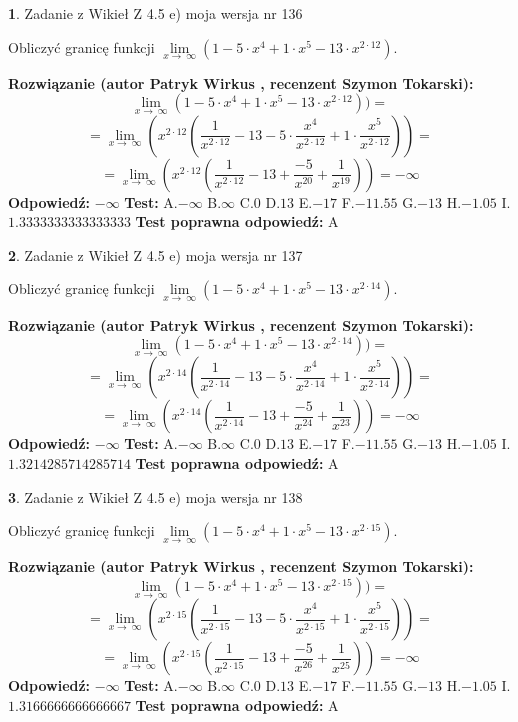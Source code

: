 \documentclass[12pt, a4paper]{article}
\theoremstyle{definition} %
\newtheorem{zad}{}
\newcommand{\zadStart}[1]{\begin{zad}#1\newline}
\newcommand{\zadStop}{\end{zad}}
\newcommand{\rozwStart}[2]{\noindent \textbf{Rozwiązanie (autor #1 , recenzent #2): }\newline}
\newcommand{\rozwStop}{\newline}
\newcommand{\odpStart}{\noindent \textbf{Odpowiedź:}\newline}
\newcommand{\odpStop}{\newline}
\newcommand{\testStart}{\noindent \textbf{Test:}\newline}
\newcommand{\testStop}{\newline}
\newcommand{\kluczStart}{\noindent \textbf{Test poprawna odpowiedź:}\newline}
\newcommand{\kluczStop}{\newline}
\begin{document}
\zadStart{Zadanie z Wikieł Z 4.5 e) moja wersja nr 136}


Obliczyć granicę funkcji  $\lim\limits_{x\to\ \infty}(1 - 5 \cdot x^{4}+1 \cdot x^{5}- 13 \cdot x^{2\cdot12})$.
\zadStop
\rozwStart{Patryk Wirkus}{Szymon Tokarski}
$$\lim\limits_{x\to\ \infty}(1 - 5 \cdot x^{4}+1 \cdot x^{5}- 13 \cdot x^{2\cdot12}))=$$
$$=\lim\limits_{x\to\ \infty}(x^{2\cdot12}(\frac{1}{x^{2\cdot12}}-13 -5 \cdot \frac{x^{4}}{x^{2\cdot12}}+1 \cdot \frac{x^{5}}{x^{2\cdot12}}))=$$
$$=\lim\limits_{x\to\ \infty}(x^{2\cdot12}(\frac{1}{x^{2\cdot12}}-13 + \frac{-5}{x^{20}}+ \frac{1}{x^{19}}))=-\infty$$
\rozwStop
\odpStart
$-\infty$
\odpStop
\testStart
A.$-\infty$ B.$\infty$ C.$0$ D.$13$ E.$-17$
F.$-11.55$ G.$-13$
H.$-1.05$
I.$1.3333333333333333$
\testStop
\kluczStart
A
\kluczStop



\zadStart{Zadanie z Wikieł Z 4.5 e) moja wersja nr 137}


Obliczyć granicę funkcji  $\lim\limits_{x\to\ \infty}(1 - 5 \cdot x^{4}+1 \cdot x^{5}- 13 \cdot x^{2\cdot14})$.
\zadStop
\rozwStart{Patryk Wirkus}{Szymon Tokarski}
$$\lim\limits_{x\to\ \infty}(1 - 5 \cdot x^{4}+1 \cdot x^{5}- 13 \cdot x^{2\cdot14}))=$$
$$=\lim\limits_{x\to\ \infty}(x^{2\cdot14}(\frac{1}{x^{2\cdot14}}-13 -5 \cdot \frac{x^{4}}{x^{2\cdot14}}+1 \cdot \frac{x^{5}}{x^{2\cdot14}}))=$$
$$=\lim\limits_{x\to\ \infty}(x^{2\cdot14}(\frac{1}{x^{2\cdot14}}-13 + \frac{-5}{x^{24}}+ \frac{1}{x^{23}}))=-\infty$$
\rozwStop
\odpStart
$-\infty$
\odpStop
\testStart
A.$-\infty$ B.$\infty$ C.$0$ D.$13$ E.$-17$
F.$-11.55$ G.$-13$
H.$-1.05$
I.$1.3214285714285714$
\testStop
\kluczStart
A
\kluczStop



\zadStart{Zadanie z Wikieł Z 4.5 e) moja wersja nr 138}


Obliczyć granicę funkcji  $\lim\limits_{x\to\ \infty}(1 - 5 \cdot x^{4}+1 \cdot x^{5}- 13 \cdot x^{2\cdot15})$.
\zadStop
\rozwStart{Patryk Wirkus}{Szymon Tokarski}
$$\lim\limits_{x\to\ \infty}(1 - 5 \cdot x^{4}+1 \cdot x^{5}- 13 \cdot x^{2\cdot15}))=$$
$$=\lim\limits_{x\to\ \infty}(x^{2\cdot15}(\frac{1}{x^{2\cdot15}}-13 -5 \cdot \frac{x^{4}}{x^{2\cdot15}}+1 \cdot \frac{x^{5}}{x^{2\cdot15}}))=$$
$$=\lim\limits_{x\to\ \infty}(x^{2\cdot15}(\frac{1}{x^{2\cdot15}}-13 + \frac{-5}{x^{26}}+ \frac{1}{x^{25}}))=-\infty$$
\rozwStop
\odpStart
$-\infty$
\odpStop
\testStart
A.$-\infty$ B.$\infty$ C.$0$ D.$13$ E.$-17$
F.$-11.55$ G.$-13$
H.$-1.05$
I.$1.3166666666666667$
\testStop
\kluczStart
A
\kluczStop
\end{document}
